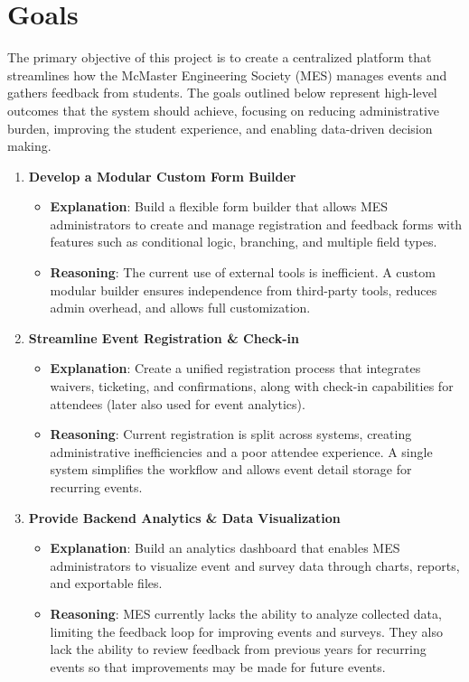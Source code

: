\documentclass{article}
\begin{document}
\section{Goals}
The primary objective of this project is to create a centralized platform that streamlines how the McMaster Engineering Society (MES) manages events and gathers feedback from students. The goals outlined below represent high-level outcomes that the system should achieve, focusing on reducing administrative burden, improving the student experience, and enabling data-driven decision making.
\begin{enumerate}
    \item \textbf{Develop a Modular Custom Form Builder}
    \begin{itemize}
        \item \textbf{Explanation}: Build a flexible form builder that allows MES administrators to create and manage registration and feedback forms with features such as conditional logic, branching, and multiple field types.
        \item \textbf{Reasoning}: The current use of external tools is inefficient. A custom modular builder ensures independence from third-party tools, reduces admin overhead, and allows full customization.
    \end{itemize}

    \item \textbf{Streamline Event Registration \& Check-in}
    \begin{itemize}
        \item \textbf{Explanation}: Create a unified registration process that integrates waivers, ticketing, and confirmations, along with check-in capabilities for attendees (later also used for event analytics).
        \item \textbf{Reasoning}: Current registration is split across systems, creating administrative inefficiencies and a poor attendee experience. A single system simplifies the workflow and allows event detail storage for recurring events.
    \end{itemize}

    \item \textbf{Provide Backend Analytics \& Data Visualization}
    \begin{itemize}
        \item \textbf{Explanation}: Build an analytics dashboard that enables MES administrators to visualize event and survey data through charts, reports, and exportable files.
        \item \textbf{Reasoning}: MES currently lacks the ability to analyze collected data, limiting the feedback loop for improving events and surveys. They also lack the ability to review feedback from previous years for recurring events so that improvements may be made for future events.
    \end{itemize}


\end{enumerate}
\end{document}
